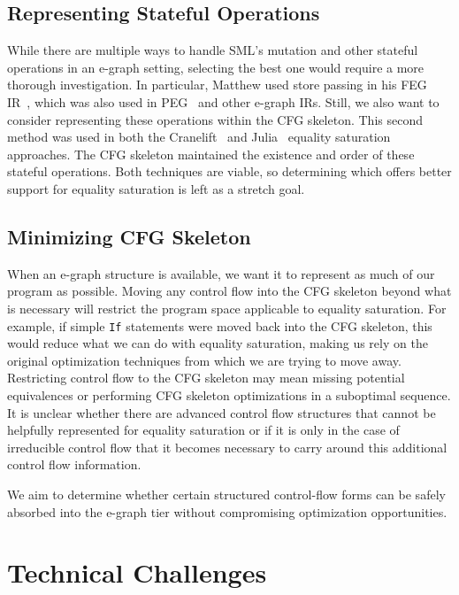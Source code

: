 \documentclass{article}
\begin{document}
\subsection{Representing Stateful Operations}

While there are multiple ways to handle SML's mutation and other stateful operations in an e-graph setting, selecting the best one would require a more thorough investigation. In particular, Matthew used store passing in his FEG IR~\cite{dellaneve_2023}, which was also used in PEG~\cite{eqsat-lmcs} and other e-graph IRs. Still, we also want to consider representing these operations within the CFG skeleton. This second method was used in both the Cranelift~\cite{fallin_2022} and Julia~\cite{merckx2025equalitysaturationoptimizinghighlevel} equality saturation approaches. The CFG skeleton maintained the existence and order of these stateful operations. Both techniques are viable, so determining which offers better support for equality saturation is left as a stretch goal.


\subsection{Minimizing CFG Skeleton}

When an e-graph structure is available, we want it to represent as much of our program as possible. Moving any control flow into the CFG skeleton beyond what is necessary will restrict the program space applicable to equality saturation. For example, if simple \verb|If| statements were moved back into the CFG skeleton, this would reduce what we can do with equality saturation, making us rely on the original optimization techniques from which we are trying to move away. Restricting control flow to the CFG skeleton may mean missing potential equivalences or performing CFG skeleton optimizations in a suboptimal sequence. It is unclear whether there are advanced control flow structures that cannot be helpfully represented for equality saturation or if it is only in the case of irreducible control flow that it becomes necessary to carry around this additional control flow information.

We aim to determine whether certain structured control-flow forms can be safely absorbed into the e-graph tier without compromising optimization opportunities.



\section{Technical Challenges}
\end{document}
